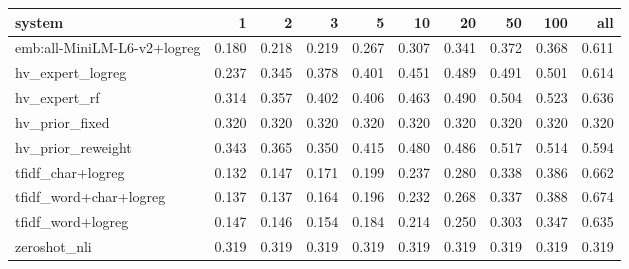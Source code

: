 \begin{tabular}{lrrrrrrrrr}
\toprule
system & 1 & 2 & 3 & 5 & 10 & 20 & 50 & 100 & all \\
\midrule
emb:all-MiniLM-L6-v2+logreg & 0.180 & 0.218 & 0.219 & 0.267 & 0.307 & 0.341 & 0.372 & 0.368 & 0.611 \\
hv\_expert\_logreg & 0.237 & 0.345 & 0.378 & 0.401 & 0.451 & 0.489 & 0.491 & 0.501 & 0.614 \\
hv\_expert\_rf & 0.314 & 0.357 & 0.402 & 0.406 & 0.463 & 0.490 & 0.504 & 0.523 & 0.636 \\
hv\_prior\_fixed & 0.320 & 0.320 & 0.320 & 0.320 & 0.320 & 0.320 & 0.320 & 0.320 & 0.320 \\
hv\_prior\_reweight & 0.343 & 0.365 & 0.350 & 0.415 & 0.480 & 0.486 & 0.517 & 0.514 & 0.594 \\
tfidf\_char+logreg & 0.132 & 0.147 & 0.171 & 0.199 & 0.237 & 0.280 & 0.338 & 0.386 & 0.662 \\
tfidf\_word+char+logreg & 0.137 & 0.137 & 0.164 & 0.196 & 0.232 & 0.268 & 0.337 & 0.388 & 0.674 \\
tfidf\_word+logreg & 0.147 & 0.146 & 0.154 & 0.184 & 0.214 & 0.250 & 0.303 & 0.347 & 0.635 \\
zeroshot\_nli & 0.319 & 0.319 & 0.319 & 0.319 & 0.319 & 0.319 & 0.319 & 0.319 & 0.319 \\
\bottomrule
\end{tabular}
